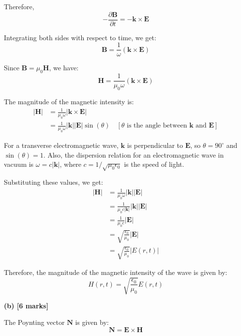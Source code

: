 \documentclass{article}
\begin{document}
Therefore,
\begin{equation*}
-\frac{\partial \mathbf{B}}{\partial t} = - \mathbf{k} \times \mathbf{E}
\end{equation*}

Integrating both sides with respect to time, we get:
\begin{equation*}
\mathbf{B} = \frac{1}{\omega} (\mathbf{k} \times \mathbf{E}) 
\end{equation*}

Since $\mathbf{B} = \mu_0 \mathbf{H}$, we have:
\begin{equation*}
\mathbf{H} = \frac{1}{\mu_0 \omega} (\mathbf{k} \times \mathbf{E})
\end{equation*}

The magnitude of the magnetic intensity is:
\begin{align*}
|\mathbf{H}| &= \frac{1}{\mu_0 \omega} |\mathbf{k} \times \mathbf{E}| \\
&= \frac{1}{\mu_0 \omega} |\mathbf{k}| |\mathbf{E}| \sin(\theta) \quad [\theta \text{ is the angle between } \mathbf{k} \text{ and } \mathbf{E}]
\end{align*}

For a transverse electromagnetic wave, $\mathbf{k}$ is perpendicular to $\mathbf{E}$, so $\theta = 90^\circ$ and $\sin(\theta) = 1$. Also, the dispersion relation for an electromagnetic wave in vacuum is $\omega = c |\mathbf{k}|$, where $c = 1/\sqrt{\mu_0 \epsilon_0}$ is the speed of light.

Substituting these values, we get:
\begin{align*}
|\mathbf{H}| &= \frac{1}{\mu_0 \omega} |\mathbf{k}| |\mathbf{E}| \\
&= \frac{1}{\mu_0 c |\mathbf{k}|} |\mathbf{k}| |\mathbf{E}| \\
&= \frac{1}{\mu_0 c} |\mathbf{E}| \\
&= \sqrt{\frac{\epsilon_0}{\mu_0}} |\mathbf{E}| \\
&= \sqrt{\frac{\epsilon_0}{\mu_0}} |E(r,t)|
\end{align*}

Therefore, the magnitude of the magnetic intensity of the wave is given by:
\begin{equation*}
H(r, t) = \sqrt{\frac{\epsilon_0}{\mu_0}} E(r, t)
\end{equation*}

\textbf{(b) [6 marks]}

The Poynting vector $\mathbf{N}$ is given by:
\begin{equation*}
\mathbf{N} = \mathbf{E} \times \mathbf{H}
\end{equation*}
\end{document}
